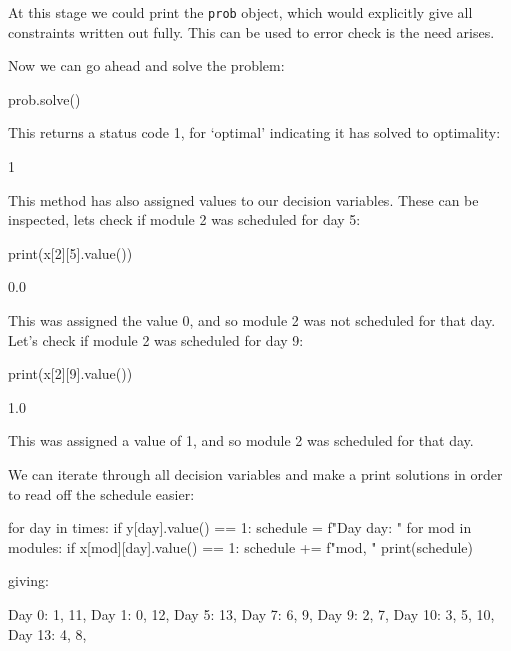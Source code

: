 At this stage we could print the \texttt{prob} object, which would
explicitly give all constraints written out fully. This can be used to error
check is the need arises.

Now we can go ahead and solve the problem:

\begin{pyin}
prob.solve()
\end{pyin}

This returns a status code 1, for `optimal' indicating it has solved to
optimality:

\begin{pyout}
1
\end{pyout}

This method has also assigned values to our decision variables. These can be
inspected, lets check if module 2 was scheduled for day 5:

\begin{pyin}
print(x[2][5].value())
\end{pyin}

\begin{pyout}
0.0
\end{pyout}

This was assigned the value 0, and so module 2 was not scheduled for that day.
Let's check if module 2 was scheduled for day 9:

\begin{pyin}
print(x[2][9].value())
\end{pyin}

\begin{pyout}
1.0
\end{pyout}

This was assigned a value of 1, and so module 2 was scheduled for that day.

We can iterate through all decision variables and make a print solutions in
order to read off the schedule easier:

\begin{pyin}
for day in times:
    if y[day].value() == 1:
        schedule = f"Day {day}: "
        for mod in modules:
            if x[mod][day].value() == 1:
                 schedule += f"{mod}, "
        print(schedule)
\end{pyin}

giving:

\begin{pyout}
Day 0: 1, 11, 
Day 1: 0, 12, 
Day 5: 13, 
Day 7: 6, 9, 
Day 9: 2, 7, 
Day 10: 3, 5, 10, 
Day 13: 4, 8, 
\end{pyout}


